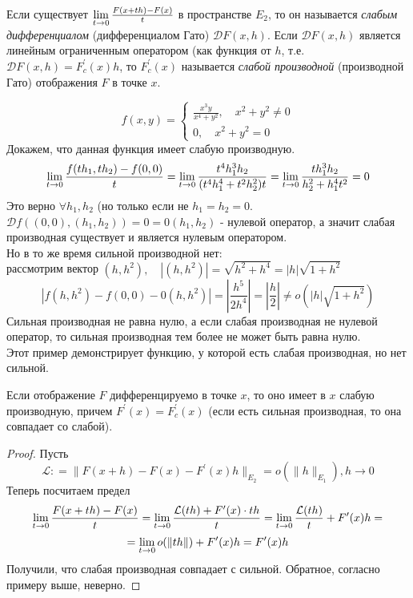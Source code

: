 \begin{definition}
    Если существует $\lim\limits_{t \to 0} \frac{F(x+th)-F(x)}{t}$ в пространстве $E_2$, то он называется \textit{слабым дифференциалом} (дифференциалом Гато) $\mathcal{D}F(x, h)$. Если $\mathcal{D}F(x, h)$ является линейным ограниченным оператором (как функция от $h$, т.е. $\mathcal{D}F(x, h) = F^\prime_c(x) h$, то $F^\prime_c(x)$ называется \textit{слабой производной} (производной Гато) отображения $F$ в точке $x$.
\end{definition}

\begin{example}
    \begin{equation}
         f(x, y) = 
        \begin{cases}
            \frac{x^3y}{x^4+y^2}, \quad x^2+y^2 \neq 0\\
            0, \quad x^2+y^2=0
        \end{cases}
    \end{equation}
    Докажем, что данная функция имеет слабую производную. \\
    \[
        \lim\limits_{t \to 0} \frac{f(t h_1, t h_2) - f(0, 0)}{t} = \lim\limits_{t \to 0} \frac{t^4 h_1^3 h_2}{(t^4 h_1^4+t^2 h_2^2)t}=\lim\limits_{t \to 0} \frac{t h_1^3 h_2}{h_2^2+h_1^4 t^2} = 0
    \] 
    Это верно $\forall h_1, h_2$ (но только если не $h_1=h_2=0$.\\
    $\mathcal{D}f((0, 0), (h_1, h_2))=0 =0(h_1, h_2)$ - нулевой оператор, а значит слабая производная существует и является нулевым оператором.\\
    Но в то же время сильной производной нет$\colon$\\
    рассмотрим вектор $(h, h^2), \quad |(h, h^2)| = \sqrt{h^2+h^4}=|h|\sqrt{1+h^2}$
    \[
        |f(h, h^2)-f(0, 0)-0(h, h^2)|=\left |\frac{h^5}{2 h^4} \right | =\left |\frac{h}{2}\right |  \neq o(|h|\sqrt{1+h^2})
    \]
    Сильная производная не равна нулю, а если слабая производная не нулевой оператор, то сильная производная тем более не может быть равна нулю.\\
    Этот пример демонстрирует функцию, у которой есть слабая производная, но нет сильной.
\end{example}

\begin{proposition}
    Если отображение $F$ дифференцируемо в точке $x$, то оно имеет в $x$ слабую производную, причем $F^\prime(x)=F^\prime_c (x)$ (если есть сильная производная, то она совпадает со слабой).
\end{proposition}
\begin{proof}
    Пусть 
    \[
        \mathcal{L}\colon=\|F(x+h)-F(x)-F^\prime(x)h\|_{E_2}=o(\|h\|_{E_1}), h \to 0
    \]
    Теперь посчитаем предел
    \[
        \lim\limits_{t \to 0} \frac{F(x+t h)-F(x)}{t} = \lim\limits_{t \to 0} \frac{\mathcal{L} (t h) + F^\prime (x) \cdot t h}{t} = \lim\limits_{t \to 0} \frac{\mathcal{L} (t h)}{t} + F^\prime(x) h =
    \]
    \[
        =\lim\limits_{t\to 0} o(\|th\|) + F^\prime(x) h = F^\prime(x) h 
    \]
    Получили, что слабая производная совпадает с сильной. Обратное, согласно примеру выше, неверно.
\end{proof}

